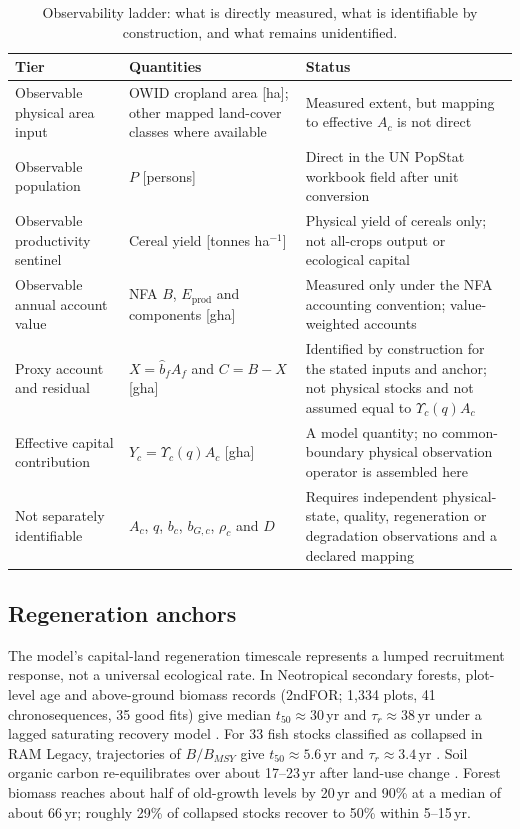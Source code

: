 \documentclass[11pt,a4paper]{article}
\newcommand{\Ups}{\Upsilon_c}
\begin{document}
\begin{table}[htbp]
\centering\small
\caption{Observability ladder: what is directly measured, what is identifiable by construction, and what remains unidentified.}
\label{tab:si_ladder}
\begin{tabularx}{\textwidth}{>{\raggedright\arraybackslash}p{} X >{\raggedright\arraybackslash}p{}}
\toprule
Tier & Quantities & Status \\
\midrule
Observable physical area input & OWID cropland area [ha]; other mapped land-cover classes where available & Measured extent, but mapping to effective $A_c$ is not direct \\
Observable population & $P$ [persons] & Direct in the UN PopStat workbook field after unit conversion \\
Observable productivity sentinel & Cereal yield [tonnes ha$^{-1}$] & Physical yield of cereals only; not all-crops output or ecological capital \\
Observable annual account value & NFA $B$, $E_{\mathrm{prod}}$ and components [gha] & Measured only under the NFA accounting convention; value-weighted accounts \\
Proxy account and residual & $X=\hat b_fA_f$ and $C=B-X$ [gha] & Identified by construction for the stated inputs and anchor; not physical stocks and not assumed equal to $\Ups(q)A_c$ \\
Effective capital contribution & $Y_c=\Ups(q)A_c$ [gha] & A model quantity; no common-boundary physical observation operator is assembled here \\
Not separately identifiable & $A_c$, $q$, $b_c$, $b_{G,c}$, $\rho_c$ and $D$ & Requires independent physical-state, quality, regeneration or degradation observations and a declared mapping \\
\bottomrule
\end{tabularx}
\end{table}

\subsection{Regeneration anchors}\label{si:anchors}

The model's capital-land regeneration timescale represents a lumped recruitment response, not a universal ecological rate. In Neotropical secondary forests, plot-level age and above-ground biomass records (2ndFOR; 1,334 plots, 41 chronosequences, 35 good fits) give median $t_{50}\approx30$\,yr and $\tau_r\approx38$\,yr under a lagged saturating recovery model \citep{Poorter2016}. For 33 fish stocks classified as collapsed in RAM Legacy, trajectories of $B/B_{MSY}$ give $t_{50}\approx5.6$\,yr and $\tau_r\approx3.4$\,yr \citep{HutchingsReynolds2004,Neubauer2013}. Soil organic carbon re-equilibrates over about 17--23\,yr after land-use change \citep{Poeplau2011}. Forest biomass reaches about half of old-growth levels by 20\,yr and 90\% at a median of about 66\,yr; roughly 29\% of collapsed stocks recover to 50\% within 5--15\,yr.
\end{document}
